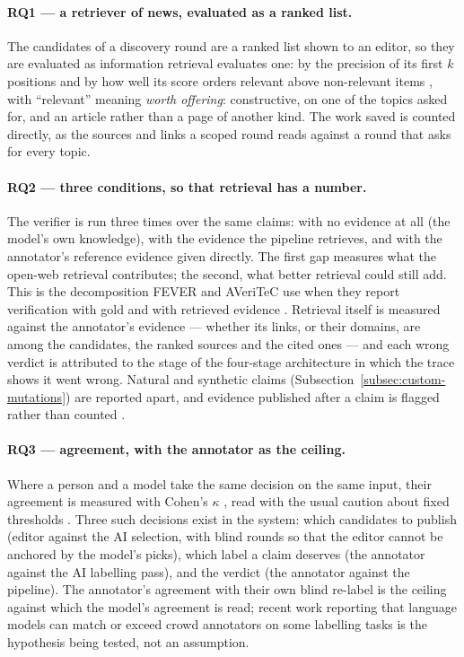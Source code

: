 \paragraph{RQ1 --- a retriever of news, evaluated as a ranked list.}
The candidates of a discovery round are a ranked list shown to an
editor, so they are evaluated as information retrieval evaluates
one: by the precision of its first $k$ positions and by how well its
score orders relevant above non-relevant items
\cite{jarvelin2002cumulated}, with ``relevant'' meaning \emph{worth
offering}: constructive, on one of the topics asked for, and an
article rather than a page of another kind. The work saved is
counted directly, as the sources and links a scoped round reads
against a round that asks for every topic.

\paragraph{RQ2 --- three conditions, so that retrieval has a number.}
The verifier is run three times over the same claims: with no
evidence at all (the model's own knowledge), with the evidence the
pipeline retrieves, and with the annotator's reference evidence
given directly. The first gap measures what the open-web retrieval
contributes; the second, what better retrieval could still add. This
is the decomposition FEVER and AVeriTeC use when they report
verification with gold and with retrieved evidence
\cite{thorne2018fever,schlichtkrull2023averitec}. Retrieval itself
is measured against the annotator's evidence --- whether its links,
or their domains, are among the candidates, the ranked sources and
the cited ones --- and each wrong verdict is attributed to the stage
of the four-stage architecture \cite{guo2022survey} in which the
trace shows it went wrong. Natural and synthetic claims
(Subsection~\ref{subsec:custom-mutations}) are reported apart, and
evidence published after a claim is flagged rather than counted
\cite{glockner2022missing}.

\paragraph{RQ3 --- agreement, with the annotator as the ceiling.}
Where a person and a model take the same decision on the same input,
their agreement is measured with Cohen's $\kappa$
\cite{cohen1960coefficient}, read with the usual caution about fixed
thresholds \cite{artstein2008intercoder,landis1977measurement}. Three
such decisions exist in the system: which candidates to publish
(editor against the AI selection, with blind rounds so that the
editor cannot be anchored by the model's picks), which label a claim
deserves (the annotator against the AI labelling pass), and the
verdict (the annotator against the pipeline). The annotator's
agreement with their own blind re-label is the ceiling against which
the model's agreement is read; recent work reporting that language
models can match or exceed crowd annotators on some labelling tasks
\cite{gilardi2023chatgpt} is the hypothesis being tested, not an
assumption.


